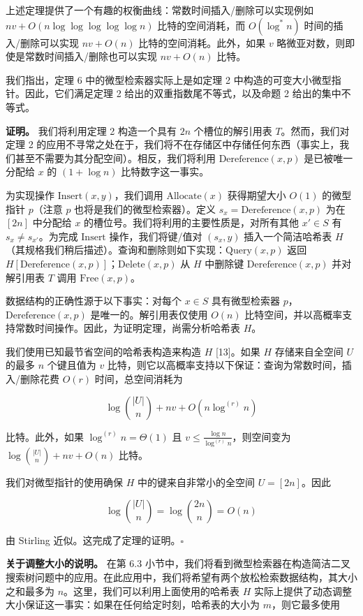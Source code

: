 \documentclass[12pt,a4paper]{ctexart}
\theoremstyle{remark}
\begin{document}
上述定理提供了一个有趣的权衡曲线：常数时间插入/删除可以实现例如 $nv+O(n\log\log\log\log\log n)$ 比特的空间消耗，而 $O(\log^* n)$ 时间的插入/删除可以实现 $nv+O(n)$ 比特的空间消耗。此外，如果 $v$ 略微亚对数，则即使是常数时间插入/删除也可以实现 $nv+O(n)$ 比特。

我们指出，定理 6 中的微型检索器实际上是如定理 2 中构造的可变大小微型指针。因此，它们满足定理 2 给出的双重指数尾不等式，以及命题 2 给出的集中不等式。

\textbf{证明。} 我们将利用定理 2 构造一个具有 $2n$ 个槽位的解引用表 $T$。然而，我们对定理 2 的应用不寻常之处在于，我们将不在存储区中存储任何东西（事实上，我们甚至不需要为其分配空间）。相反，我们将利用 $\text{Dereference}(x,p)$ 是已被唯一分配给 $x$ 的 $(1+\log n)$ 比特数字这一事实。

为实现操作 $\text{Insert}(x,y)$，我们调用 $\text{Allocate}(x)$ 获得期望大小 $O(1)$ 的微型指针 $p$（注意 $p$ 也将是我们的微型检索器）。定义 $s_x=\text{Dereference}(x,p)$ 为在 $[2n]$ 中分配给 $x$ 的槽位号。我们将利用的主要性质是，对所有其他 $x'\in S$ 有 $s_x\neq s_{x'}$。为完成 $\text{Insert}$ 操作，我们将键/值对 $(s_x,y)$ 插入一个简洁哈希表 $H$（其规格我们稍后描述）。查询和删除则如下实现：$\text{Query}(x,p)$ 返回 $H[\text{Dereference}(x,p)]$；$\text{Delete}(x,p)$ 从 $H$ 中删除键 $\text{Dereference}(x,p)$ 并对解引用表 $T$ 调用 $\text{Free}(x,p)$。

数据结构的正确性源于以下事实：对每个 $x\in S$ 具有微型检索器 $p$，$\text{Dereference}(x,p)$ 是唯一的。解引用表仅使用 $O(n)$ 比特空间，并以高概率支持常数时间操作。因此，为证明定理，尚需分析哈希表 $H$。

我们使用已知最节省空间的哈希表构造来构造 $H$ [13]。如果 $H$ 存储来自全空间 $U$ 的最多 $n$ 个键且值为 $v$ 比特，则它以高概率支持以下保证：查询为常数时间，插入/删除花费 $O(r)$ 时间，总空间消耗为

$$\log\binom{|U|}{n}+nv+O(n\log^{(r)}n)$$

比特。此外，如果 $\log^{(r)}n=\Theta(1)$ 且 $v\leq\frac{\log n}{\log^{(r)}n}$，则空间变为 $\log\binom{|U|}{n}+nv+O(n)$ 比特。

我们对微型指针的使用确保 $H$ 中的键来自非常小的全空间 $U=[2n]$。因此

$$\log\binom{|U|}{n}=\log\binom{2n}{n}=O(n)$$

由 Stirling 近似。这完成了定理的证明。$\square$

\textbf{关于调整大小的说明。} 在第 6.3 小节中，我们将看到微型检索器在构造简洁二叉搜索树问题中的应用。在此应用中，我们将希望有两个放松检索数据结构，其大小之和最多为 $n$。这里，我们可以利用上面使用的哈希表 $H$ 实际上提供了动态调整大小保证这一事实：如果在任何给定时刻，哈希表的大小为 $m$，则它最多使用
\end{document}
